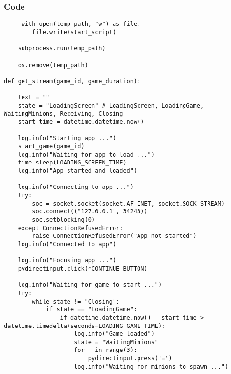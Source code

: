 \documentclass{beamer}
\begin{document}
\begin{frame}[fragile]
    \frametitle{Code}
    \fontsize{3pt}{5pt}\selectfont
    \begin{verbatim}
     with open(temp_path, "w") as file:
        file.write(start_script)

    subprocess.run(temp_path)

    os.remove(temp_path)    

def get_stream(game_id, game_duration):

    text = ""
    state = "LoadingScreen" # LoadingScreen, LoadingGame, WaitingMinions, Receiving, Closing
    start_time = datetime.datetime.now()

    log.info("Starting app ...")
    start_game(game_id)
    log.info("Waiting for app to load ...")
    time.sleep(LOADING_SCREEN_TIME)
    log.info("App started and loaded")

    log.info("Connecting to app ...")
    try:
        soc = socket.socket(socket.AF_INET, socket.SOCK_STREAM)
        soc.connect(("127.0.0.1", 34243))
        soc.setblocking(0)
    except ConnectionRefusedError:
        raise ConnectionRefusedError("App not started")
    log.info("Connected to app")

    log.info("Focusing app ...")
    pydirectinput.click(*CONTINUE_BUTTON)

    log.info("Waiting for game to start ...")
    try:
        while state != "Closing":
            if state == "LoadingGame":
                if datetime.datetime.now() - start_time > datetime.timedelta(seconds=LOADING_GAME_TIME):
                    log.info("Game loaded")
                    state = "WaitingMinions"
                    for _ in range(3):
                        pydirectinput.press('=')
                    log.info("Waiting for minions to spawn ...")
    \end{verbatim}
\end{frame}
\end{document}
